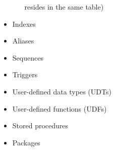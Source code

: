 \documentclass{article}
\begin{document}
\begin{itemize}
\begin{itemize}
	resides in the same table)
	\end{itemize}
\item Indexes
\item Aliases
\item Sequences
\item Triggers
\item User-defined data types (UDTs)
\item User-defined functions (UDFs)
\item Stored procedures
\item Packages
\end{itemize}






%
%
\end{document}
